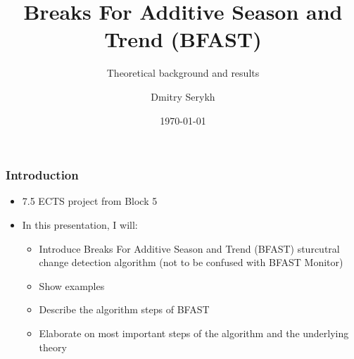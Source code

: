 \documentclass[9pt]{beamer}
\title{Breaks For Additive Season and Trend (BFAST)}
\subtitle{Theoretical background and results}
\institute{Department of Computer Science}
\author{Dmitry Serykh}
\date{\today}
\begin{document}
\frame[plain]{\titlepage}



\begin{frame}
\frametitle{Introduction}
\begin{itemize}
\item 7.5 ECTS project from Block 5
\item In this presentation, I will:
\begin{itemize}
  \item Introduce Breaks For Additive Season and Trend (BFAST) sturcutral change
    detection algorithm (not to be confused with BFAST Monitor)
  \item Show examples
  \item Describe the algorithm steps of BFAST
  \item Elaborate on most important steps of the algorithm and the underlying theory
\end{itemize}
\end{itemize}
\end{frame}









\end{document}

